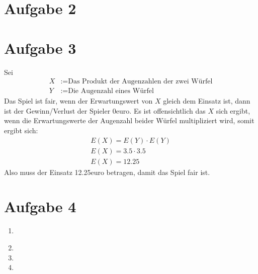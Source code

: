 \documentclass[a4paper,10pt]{article}
\begin{document}
\section*{Aufgabe 2}
\section*{Aufgabe 3}
Sei
\begin{align*}
    X &:= \text{Das Produkt der Augenzahlen der zwei Würfel} \\
    Y &:= \text{Die Augenzahl eines Würfel}
\end{align*}
Das Spiel ist fair, wenn der Erwartungswert von $X$ gleich dem Einsatz ist, dann ist der Gewinn/Verlust der Spieler 0euro. Es ist offensichtlich das $X$ sich ergibt, wenn die Erwartungswerte der Augenzahl beider Würfel multipliziert wird, somit ergibt sich:
\begin{align*}
    E(X) = E(Y) \cdot E(Y) \\
    E(X) = 3.5 \cdot 3.5 \\
    E(X) = 12.25
\end{align*}
Also muss der Einsatz 12.25euro betragen, damit das Spiel fair ist.
\section*{Aufgabe 4}
    \begin{enumerate}[~~a.)]
        \item ~\\
         \begin{center}
        \end{center}
        \item
        \item
        \item
    \end{enumerate}
\end{document}
